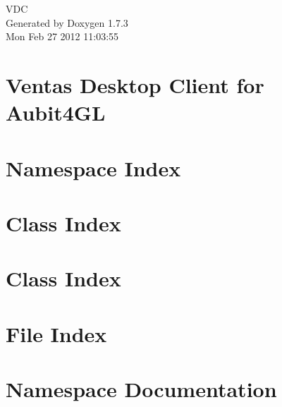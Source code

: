 \documentclass[a4paper]{book}
\begin{document}
\hypersetup{pageanchor=false}
\begin{titlepage}
\vspace*{7cm}
\begin{center}
{\Large VDC }\\
\vspace*{1cm}
{\large Generated by Doxygen 1.7.3}\\
\vspace*{0.5cm}
{\small Mon Feb 27 2012 11:03:55}\\
\end{center}
\end{titlepage}
\clearemptydoublepage
{}
\tableofcontents
\clearemptydoublepage
{}
\hypersetup{pageanchor=true}
\chapter{Ventas Desktop Client for Aubit4GL}
\label{index}\hypertarget{index}{}
\chapter{Namespace Index}

\chapter{Class Index}

\chapter{Class Index}

\chapter{File Index}

\chapter{Namespace Documentation}




\end{document}
